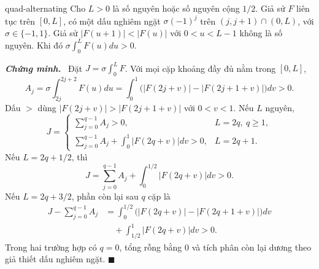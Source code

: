 \documentclass[12pt,a4paper,oneside]{book}
\numberwithin{algorithm}{chapter}
\theoremstyle{definition}
\newenvironment{chungminh}{\par\medskip\noindent\textbf{\textit{\color{mainblue}Chứng minh.}}\ }{\hfill$\blacksquare$\par\medskip}
\begin{document}
\begin{bode}{}{quad-alternating}
Cho $L>0$ là số nguyên hoặc số nguyên cộng $1/2$. Giả sử $F$ liên tục trên $[0,L]$, có một dấu nghiêm ngặt $\sigma(-1)^j$ trên $(j,j+1)\cap(0,L)$, với $\sigma\in\{-1,1\}$. Giả sử $|F(u+1)|<|F(u)|$ với $0<u<L-1$ không là số nguyên. Khi đó $\sigma\int_0^LF(u)du>0$.
\end{bode}
\begin{chungminh}
Đặt $J=\sigma\int_0^LF$. Với mọi cặp khoảng đầy đủ nằm trong $[0,L]$,
\[
 A_j=\sigma\int_{2j}^{2j+2}F(u)du
 =\int_0^1\bigl(|F(2j+v)|-|F(2j+1+v)|\bigr)dv>0.
\]
Dấu $>$ dùng $|F(2j+v)|>|F(2j+1+v)|$ với $0<v<1$. Nếu $L$ nguyên,
\[
 J=\begin{cases}
 \sum_{j=0}^{q-1}A_j>0,&L=2q,\ q\geq1,\\
 \sum_{j=0}^{q-1}A_j+\int_0^1|F(2q+v)|dv>0,&L=2q+1.
 \end{cases}
\]
Nếu $L=2q+1/2$, thì
\[
 J=\sum_{j=0}^{q-1}A_j+\int_0^{1/2}|F(2q+v)|dv>0.
\]
Nếu $L=2q+3/2$, phần còn lại sau $q$ cặp là
\begin{align*}
 J-\sum_{j=0}^{q-1}A_j
 &=\int_0^{1/2}\bigl(|F(2q+v)|-|F(2q+1+v)|\bigr)dv\\
 &\quad+\int_{1/2}^1|F(2q+v)|dv>0.
\end{align*}
Trong hai trường hợp có $q=0$, tổng rỗng bằng $0$ và tích phân còn lại dương theo giả thiết dấu nghiêm ngặt.
\end{chungminh}
\end{document}

